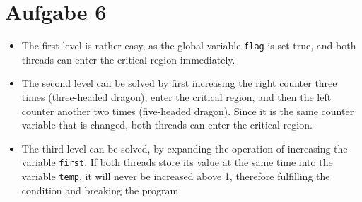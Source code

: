 \documentclass{article}
\begin{document}
\section*{Aufgabe 6}
\begin{itemize}
    \item The first level is rather easy, as the global variable \texttt{flag}
	is set true, and both threads can enter the critical region immediately.
    \item The second level can be solved by first increasing the right counter
	three times (three-headed dragon), enter
	the critical region, and then the left counter another two
	times (five-headed dragon). Since it is the same counter variable that
	is changed, both threads can enter the critical region.
    \item The third level can be solved, by expanding the operation of increasing
	the variable \texttt{first}. If both threads store its value at the same
	time into the variable \texttt{temp}, it will never be increased above 1,
	therefore fulfilling the condition and breaking the program.
\end{itemize}
\end{document}
